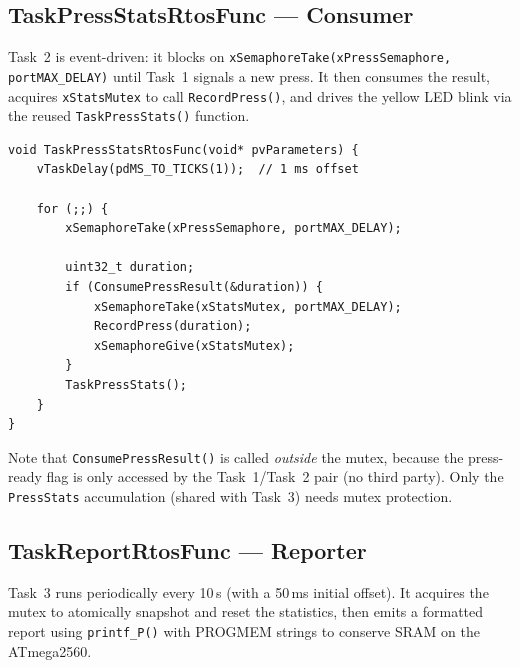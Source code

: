 \documentclass[12pt]{article}
\begin{document}
\subsection{TaskPressStatsRtosFunc — Consumer}

Task~2 is event-driven: it blocks on \texttt{xSemaphoreTake(xPressSemaphore, portMAX\_DELAY)} until Task~1 signals a new press. It then consumes the result, acquires \texttt{xStatsMutex} to call \texttt{RecordPress()}, and drives the yellow LED blink via the reused \texttt{TaskPressStats()} function.

\begin{lstlisting}[caption={TaskPressStatsRtosFunc — FreeRTOS consumer wrapper}]
void TaskPressStatsRtosFunc(void* pvParameters) {
    vTaskDelay(pdMS_TO_TICKS(1));  // 1 ms offset

    for (;;) {
        xSemaphoreTake(xPressSemaphore, portMAX_DELAY);

        uint32_t duration;
        if (ConsumePressResult(&duration)) {
            xSemaphoreTake(xStatsMutex, portMAX_DELAY);
            RecordPress(duration);
            xSemaphoreGive(xStatsMutex);
        }
        TaskPressStats();
    }
}
\end{lstlisting}

Note that \texttt{ConsumePressResult()} is called \emph{outside} the mutex, because the press-ready flag is only accessed by the Task~1/Task~2 pair (no third party). Only the \texttt{PressStats} accumulation (shared with Task~3) needs mutex protection.

\subsection{TaskReportRtosFunc — Reporter}

Task~3 runs periodically every 10\,s (with a 50\,ms initial offset). It acquires the mutex to atomically snapshot and reset the statistics, then emits a formatted report using \texttt{printf\_P()} with PROGMEM strings to conserve SRAM on the ATmega2560.
\end{document}
